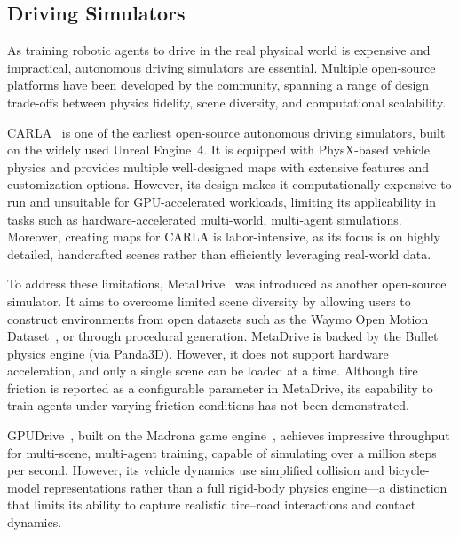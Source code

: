 \subsection{Driving Simulators}
\label{sec:rw_simulators}

As training robotic agents to drive in the real physical world is expensive and impractical, autonomous driving simulators are essential.
Multiple open-source platforms have been developed by the community, spanning a range of design trade-offs between physics fidelity, scene diversity, and computational scalability.

CARLA~\cite{Dosovitskiy17} is one of the earliest open-source autonomous driving simulators, built on the widely used Unreal Engine~4.
It is equipped with PhysX-based vehicle physics and provides multiple well-designed maps with extensive features and customization options.
However, its design makes it computationally expensive to run and unsuitable for GPU-accelerated workloads, limiting its applicability in tasks such as hardware-accelerated multi-world, multi-agent simulations.
Moreover, creating maps for CARLA is labor-intensive, as its focus is on highly detailed, handcrafted scenes rather than efficiently leveraging real-world data.

To address these limitations, MetaDrive~\cite{li2022metadrive} was introduced as another open-source simulator.
It aims to overcome limited scene diversity by allowing users to construct environments from open datasets such as the Waymo Open Motion Dataset~\cite{Kan_2024_icra}, or through procedural generation.
MetaDrive is backed by the Bullet physics engine (via Panda3D).
However, it does not support hardware acceleration, and only a single scene can be loaded at a time.
Although tire friction is reported as a configurable parameter in MetaDrive, its capability to train agents under varying friction conditions has not been demonstrated.

GPUDrive~\cite{kazemkhani_gpudrive_2025}, built on the Madrona game engine~\cite{shacklett_madrona_2023}, achieves impressive throughput for multi-scene, multi-agent training, capable of simulating over a million steps per second.
However, its vehicle dynamics use simplified collision and bicycle-model representations rather than a full rigid-body physics engine—a distinction that limits its ability to capture realistic tire--road interactions and contact dynamics.

